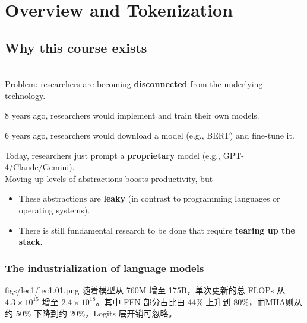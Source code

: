
\vspace{-10cm}
\chapter{Overview and Tokenization}

\vspace{-2cm}


{\chaptoc\noindent\begin{minipage}[inner sep=0,outer sep=0]{0.9\linewidth}\section{Why this course exists}\end{minipage}}
\\
Problem: researchers are becoming {\color{tred}\textbf{disconnected}} from the underlying technology.

8 years ago, researchers would implement and train their own models.

6 years ago, researchers would download a model (e.g., BERT) and fine-tune it.

Today, researchers just prompt a {\color{tred}\textbf{proprietary}} model (e.g., GPT-4/Claude/Gemini).\\

Moving up levels of abstractions boosts productivity, but
\begin{itemize}
    \item These abstractions are \textbf{leaky} (in contrast to programming languages or operating systems).
    \item There is still fundamental research to be done that require \textbf{tearing up the stack}.
\end{itemize}



\subsection{The industrialization of language models
}
\MarginImageWithNote
  {figs/lec1/lec1.01.png}
  {}
  {%
    随着模型从 760M 增至 175B，单次更新的总 FLOPs 从 $4.3\times10^{15}$ 增至 $2.4\times10^{18}$。其中 FFN 部分占比由 44\% 上升到 80\%，而MHA则从约 50\% 下降到约 20\%，Logits 层开销可忽略。%
  }

